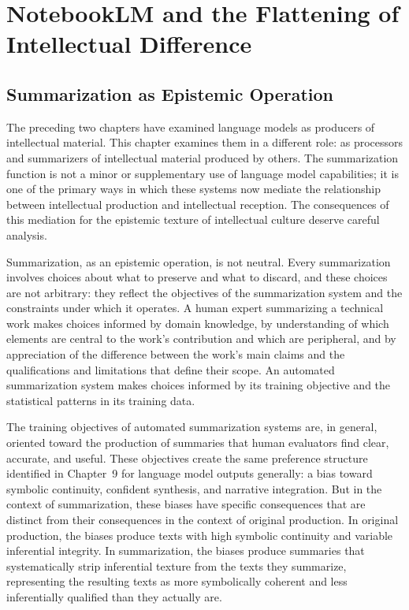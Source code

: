 \documentclass[12pt, openright, twoside]{book}
\begin{document}
\chapter{NotebookLM and the Flattening of Intellectual Difference}

\section{Summarization as Epistemic Operation}

The preceding two chapters have examined language
models as producers of intellectual material.
This chapter examines them in a different role:
as processors and summarizers of intellectual
material produced by others. The summarization
function is not a minor or supplementary use
of language model capabilities; it is one of
the primary ways in which these systems now
mediate the relationship between intellectual
production and intellectual reception. The
consequences of this mediation for the
epistemic texture of intellectual culture
deserve careful analysis.

Summarization, as an epistemic operation, is
not neutral. Every summarization involves
choices about what to preserve and what to
discard, and these choices are not arbitrary:
they reflect the objectives of the summarization
system and the constraints under which it
operates. A human expert summarizing a technical
work makes choices informed by domain knowledge,
by understanding of which elements are central
to the work's contribution and which are peripheral,
and by appreciation of the difference between the
work's main claims and the qualifications and
limitations that define their scope. An automated
summarization system makes choices informed by
its training objective and the statistical patterns
in its training data.

The training objectives of automated summarization
systems are, in general, oriented toward the
production of summaries that human evaluators
find clear, accurate, and useful. These objectives
create the same preference structure identified
in Chapter~9 for language model outputs generally:
a bias toward symbolic continuity, confident
synthesis, and narrative integration. But in
the context of summarization, these biases have
specific consequences that are distinct from
their consequences in the context of original
production. In original production, the biases
produce texts with high symbolic continuity and
variable inferential integrity. In summarization,
the biases produce summaries that systematically
strip inferential texture from the texts they
summarize, representing the resulting texts as
more symbolically coherent and less inferentially
qualified than they actually are.
\end{document}
